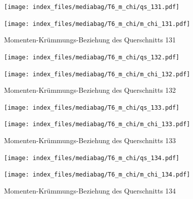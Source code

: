 \documentclass[
  11pt,
  letterpaper,
]{scrreprt}
\begin{document}
\begin{figure}[H]

\begin{minipage}{0.50\linewidth}
\texttt{[image: index\_files/mediabag/T6\_m\_chi/qs\_131.pdf]}\end{minipage}%
%
\begin{minipage}{0.50\linewidth}
\texttt{[image: index\_files/mediabag/T6\_m\_chi/m\_chi\_131.pdf]}\end{minipage}%

\caption{\label{fig-m_chi_appendix}Momenten-Krümmungs-Beziehung des
Querschnitts 131}

\end{figure}%

\begin{figure}[H]

\begin{minipage}{0.50\linewidth}
\texttt{[image: index\_files/mediabag/T6\_m\_chi/qs\_132.pdf]}\end{minipage}%
%
\begin{minipage}{0.50\linewidth}
\texttt{[image: index\_files/mediabag/T6\_m\_chi/m\_chi\_132.pdf]}\end{minipage}%

\caption{\label{fig-m_chi_appendix}Momenten-Krümmungs-Beziehung des
Querschnitts 132}

\end{figure}%

\begin{figure}[H]

\begin{minipage}{0.50\linewidth}
\texttt{[image: index\_files/mediabag/T6\_m\_chi/qs\_133.pdf]}\end{minipage}%
%
\begin{minipage}{0.50\linewidth}
\texttt{[image: index\_files/mediabag/T6\_m\_chi/m\_chi\_133.pdf]}\end{minipage}%

\caption{\label{fig-m_chi_appendix}Momenten-Krümmungs-Beziehung des
Querschnitts 133}

\end{figure}%

\begin{figure}[H]

\begin{minipage}{0.50\linewidth}
\texttt{[image: index\_files/mediabag/T6\_m\_chi/qs\_134.pdf]}\end{minipage}%
%
\begin{minipage}{0.50\linewidth}
\texttt{[image: index\_files/mediabag/T6\_m\_chi/m\_chi\_134.pdf]}\end{minipage}%

\caption{\label{fig-m_chi_appendix}Momenten-Krümmungs-Beziehung des
Querschnitts 134}

\end{figure}%
\end{document}

